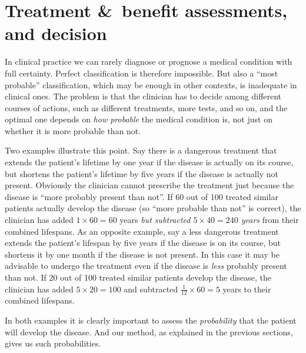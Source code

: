 \documentclass[utf8]{FrontiersinHarvard} %
\newcommand*{\amp}{\&}
\renewcommand*{\|}[1][]{\nonscript\:#1\vert\nonscript\:\mathopen{}}
\begin{document}



\section{Treatment \amp\ benefit assessments, and decision}
\label{sec:utilities_step}

In clinical practice we can rarely diagnose or prognose a medical condition with full certainty. Perfect classification is therefore impossible. But also a \enquote{most probable} classification, which may be enough in other contexts, is inadequate in clinical ones. The problem is that the clinician has to decide among different courses of actions, such as different treatments, more tests, and so on, and the optimal one depends on \emph{how probable} the medical condition is, not just on whether it is more probable than not.

Two examples illustrate this point. Say there is a dangerous treatment that extends the patient's lifetime by one year if the disease is actually on its course, but shortens the patient's lifetime by five years if the disease is actually not present. Obviously the clinician cannot prescribe the treatment just because the disease is \enquote{more probably present than not}. If 60 out of 100 treated similar patients actually develop the disease (so \enquote{more probable than not} is correct), the clinician has added $1 \times 60 = 60$ years \emph{but subtracted $\mathit{5 \times 40 = 240}$ years} from their combined lifespans. As an opposite example, say a less dangerous treatment extends the patient's lifespan by five years if the disease is on its course, but shortens it by one month if the disease is not present. In this case it may be advisable to undergo the treatment even if the disease is \emph{less} probably present than not. If 20 out of 100 treated similar patients develop the disease, the clinician has added $5 \times 20=100$ and subtracted $\tfrac{1}{12} \times 60=5$ years to their combined lifespans.

In both examples it is clearly important to assess the \emph{probability} that the patient will develop the disease. And our method, as explained in the previous sections, gives us such probabilities.
\end{document}
